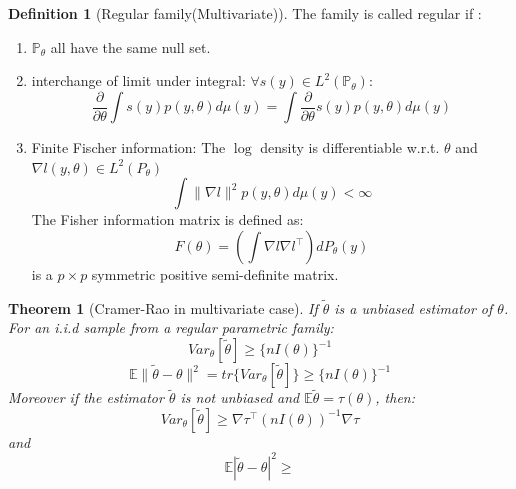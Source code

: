 \documentclass[a4paper,12pt, oneside, fleqn]{book}
\newtheorem{theorem}{Theorem}[section]
\theoremstyle{definition}
\newtheorem{definition}{Definition}[section]
\theoremstyle{remark}
\begin{document}
\begin{definition}[Regular family(Multivariate)]
The family is called regular if :
\begin{enumerate}
	\item $\mathbb{P}_{\theta}$ all have the same null set.
	\item interchange of limit under integral: $\forall s(y) \in L^2(\mathbb{P_\theta})$:
	\begin{equation*}
		\frac{\partial}{\partial \theta} \int s(y) p(y, \theta) d\mu(y) = \int \frac{\partial}{\partial \theta} s(y) p(y, \theta) d\mu(y) 
	\end{equation*}
	\item Finite Fischer information: The $\log$ density is differentiable w.r.t. $\theta$ and $\nabla l(y, \theta) \in L^2(P_\theta)$
	\begin{equation*}
		\int \|\nabla l\| ^2 p(y, \theta) d\mu(y) < \infty
	\end{equation*}
	The Fisher information matrix is defined as:
	\begin{equation*}
		F(\theta) = (\int \nabla l \nabla l^\top) dP_\theta(y)
	\end{equation*}
	is a $p \times p$ symmetric positive semi-definite matrix.
\end{enumerate}	
\end{definition}


\begin{theorem}[Cramer-Rao in multivariate case]
	If $\tilde{\theta}$ is a unbiased estimator of $\theta$. For an i.i.d sample from a regular parametric family:
	\begin{equation*}
		Var_\theta[\tilde{\theta}] \geq \{ n I(\theta)\}^{-1} 
	\end{equation*}
	\begin{equation*}
		\mathbb{E} \| \tilde{\theta} - \theta \|^2 = tr\{ Var_\theta[\tilde{\theta}]\} \geq \{n I(\theta)\}^{-1} 
	\end{equation*}
	Moreover if the estimator $\tilde{\theta}$ is not unbiased and $\mathbb{E}\tilde{\theta} =\tau(\theta)$, then:
	\begin{equation*}
		Var_\theta[\tilde{\theta}] \geq \nabla \tau^\top (nI(\theta))^{-1} \nabla \tau
	\end{equation*}
	and 
	\begin{equation*}
		\mathbb{E} |\tilde{\theta} - \theta|^2 \geq
	\end{equation*}
\end{theorem}
\end{document}
